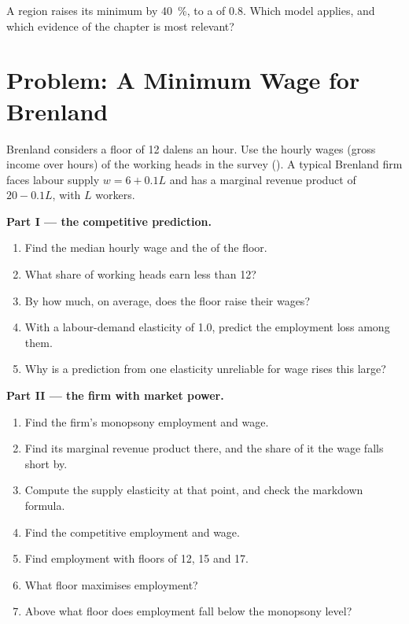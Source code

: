 \begin{exercise}[$\star\star\star$]\label{exo:b3:minimum-wage:12}
A region raises its minimum by 40~\%, to a  of 0.8. Which model applies, and which
evidence of the chapter is most relevant?
\end{exercise}

\section{Problem: A Minimum Wage for Brenland}\label{sec:b3:minimum-wage:problem}

\begin{problem}\label{pb:b3:minimum-wage:brenland}
Brenland considers a floor of 12 dalens an hour. Use the hourly wages (gross income over
hours) of the working heads in the survey (). A typical
Brenland firm faces labour supply $w = 6 + 0.1L$ and has a marginal revenue product of
$20 - 0.1L$, with $L$ workers. %

\medskip\noindent\textbf{Part I --- the competitive prediction.}
\begin{enumerate}
\item Find the median hourly wage and the  of the floor.
\item What share of working heads earn less than 12?
\item By how much, on average, does the floor raise their wages?
\item With a labour-demand elasticity of 1.0, predict the employment loss among them.
\item Why is a prediction from one elasticity unreliable for wage rises this large?
\end{enumerate}

\medskip\noindent\textbf{Part II --- the firm with market power.}
\begin{enumerate}[resume]
\item Find the firm's monopsony employment and wage.
\item Find its marginal revenue product there, and the share of it the wage falls
short by.
\item Compute the supply elasticity at that point, and check the markdown formula.
\item Find the competitive employment and wage.
\item Find employment with floors of 12, 15 and 17.
\item What floor maximises employment?
\item Above what floor does employment fall below the monopsony level?
\end{enumerate}


\end{problem}
